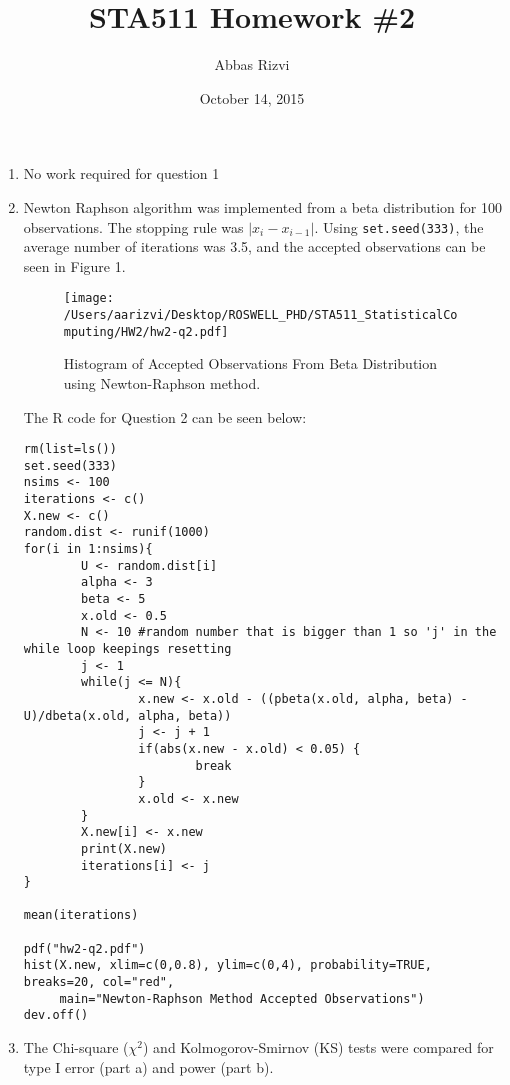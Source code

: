 \documentclass{article}
\begin{document}


\title{STA511 Homework \#2}
\date{October 14, 2015}
\author{Abbas Rizvi}
\maketitle

\begin{enumerate}

\item No work required for question 1

\item Newton Raphson algorithm was implemented from a beta distribution for 100 observations. The stopping rule was $| x_i - x_{i-1}|$. Using {\tt{set.seed(333)}}, the average number of iterations was 3.5, and the accepted observations can be seen in Figure 1.  

\begin{figure}[htpb]
\centering
\caption{Histogram of Accepted Observations From Beta Distribution using Newton-Raphson method.}
\centering
\texttt{[image: /Users/aarizvi/Desktop/ROSWELL\_PHD/STA511\_StatisticalComputing/HW2/hw2-q2.pdf]}
\end{figure}
The R code for Question 2 can be seen below:\\
\begin{verbatim}
rm(list=ls())
set.seed(333)
nsims <- 100
iterations <- c()
X.new <- c()
random.dist <- runif(1000)
for(i in 1:nsims){
        U <- random.dist[i]
        alpha <- 3
        beta <- 5
        x.old <- 0.5
        N <- 10 #random number that is bigger than 1 so 'j' in the while loop keepings resetting
        j <- 1
        while(j <= N){
                x.new <- x.old - ((pbeta(x.old, alpha, beta) - U)/dbeta(x.old, alpha, beta))
                j <- j + 1
                if(abs(x.new - x.old) < 0.05) {
                        break
                }
                x.old <- x.new
        }
        X.new[i] <- x.new
        print(X.new)
        iterations[i] <- j
}

mean(iterations)

pdf("hw2-q2.pdf")
hist(X.new, xlim=c(0,0.8), ylim=c(0,4), probability=TRUE, breaks=20, col="red",
     main="Newton-Raphson Method Accepted Observations")
dev.off()
\end{verbatim}
\item The Chi-square ($\chi^2$) and Kolmogorov-Smirnov (KS) tests were compared for type I error (part a) and power (part b).


\end{enumerate}
\end{document}
